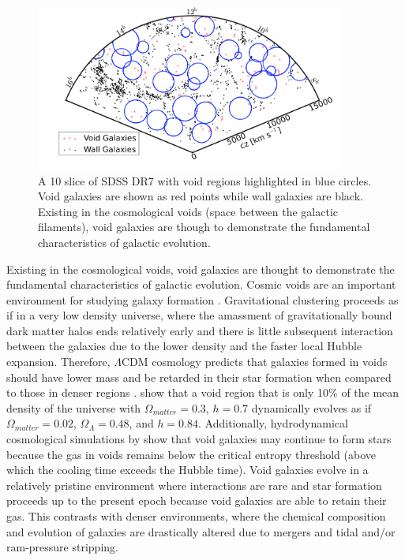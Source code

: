 \begin{figure}
    \includegraphics[width=0.9\textwidth]{Images/Intro/VoidFinder}
    \caption[Sky map highlighting voids and void galaxies]{A 10 \hMpc slice of 
    SDSS DR7 \citep[Fig. 1]{Moorman14} with void regions highlighted in blue 
    circles.  Void galaxies are shown as red points while wall galaxies are 
    black.  Existing in the cosmological voids (space between the galactic 
    filaments), void galaxies are though to demonstrate the fundamental 
    characteristics of galactic evolution.}
\end{figure}

Existing in the cosmological voids, void galaxies are thought to demonstrate the 
fundamental characteristics of galactic evolution.  Cosmic voids are an 
important environment for studying galaxy formation \citep[see][for a review]
{vandeWeygaert11}.  Gravitational clustering proceeds as if in a very low 
density universe, where the amassment of gravitationally bound dark matter halos 
ends relatively early and there is little subsequent interaction between the 
galaxies due to the lower density and the faster local Hubble expansion.  
Therefore, $\Lambda$CDM cosmology predicts that galaxies formed in voids should 
have lower mass and be retarded in their star formation when compared to those 
in denser regions \cite[e.g.,][]{Gottlober03,Goldberg05,Cen11}.  
\cite{Goldberg04} show that a void region that is only 10\% of the mean density 
of the universe with $\Omega_{matter} = 0.3$, $h = 0.7$ dynamically evolves as 
if $\Omega_{matter} = 0.02$, $\Omega_\Lambda = 0.48$, and $h = 0.84$.  
Additionally, hydrodynamical cosmological simulations by \cite{Cen11} show that 
void galaxies may continue to form stars because the gas in voids remains below 
the critical entropy threshold (above which the cooling time exceeds the Hubble 
time).  Void galaxies evolve in a relatively pristine environment where 
interactions are rare and star formation proceeds up to the present epoch 
because void galaxies are able to retain their gas.  This contrasts with denser 
environments, where the chemical composition and evolution of galaxies are 
drastically altered due to mergers and tidal and/or ram-pressure stripping.

